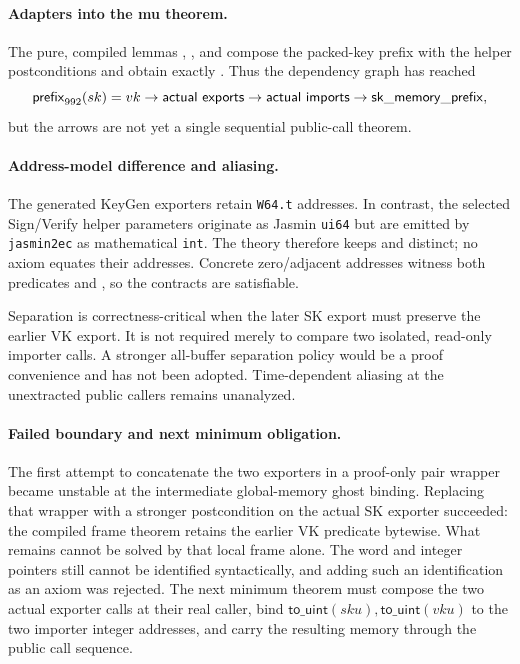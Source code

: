 \paragraph{Adapters into the mu theorem.}
The pure, compiled lemmas
,
, and
 compose the packed-key prefix
with the helper postconditions and obtain exactly
.  Thus the dependency
graph has reached
\[
  \mathsf{prefix}_{992}(sk)=vk
  \rightarrow \mathsf{actual\ exports}
  \rightarrow \mathsf{actual\ imports}
  \rightarrow \mathsf{sk\_memory\_prefix},
\]
but the arrows are not yet a single sequential public-call theorem.

\paragraph{Address-model difference and aliasing.}
The generated KeyGen exporters retain \texttt{W64.t} addresses.  In contrast,
the selected Sign/Verify helper parameters originate as Jasmin \texttt{ui64}
but are emitted by \texttt{jasmin2ec} as mathematical \texttt{int}.  The
theory therefore keeps  and
 distinct; no axiom equates their addresses.
Concrete zero/adjacent addresses witness both predicates and
, so the contracts are satisfiable.

Separation is correctness-critical when the later SK export must preserve the
earlier VK export.  It is not required merely to compare two isolated,
read-only importer calls.  A stronger all-buffer separation policy would be a
proof convenience and has not been adopted.  Time-dependent aliasing at the
unextracted public callers remains unanalyzed.

\paragraph{Failed boundary and next minimum obligation.}
The first attempt to concatenate the two exporters in a proof-only pair
wrapper became unstable at the intermediate global-memory ghost binding.
Replacing that wrapper with a stronger postcondition on the actual SK
exporter succeeded: the compiled frame theorem retains the earlier VK
predicate bytewise.  What remains cannot be solved by that local frame alone.
The word and integer pointers still cannot be identified syntactically, and
adding such an identification as an axiom was rejected.  The next minimum
theorem must compose the two actual exporter calls at their real caller, bind
\(\mathsf{to\_uint}(sku),\mathsf{to\_uint}(vku)\) to the two importer integer
addresses, and carry the resulting memory through the public call sequence.

